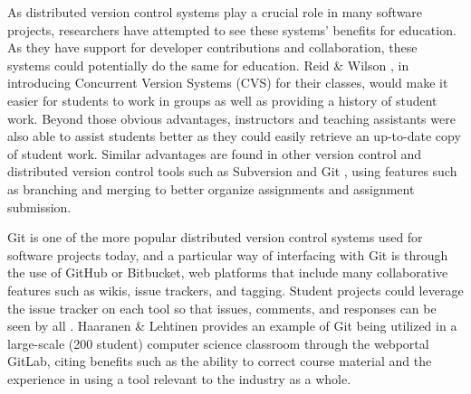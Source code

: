 As distributed version control systems play a crucial role in many software projects, researchers have attempted to see these systems’ benefits for education. As they have support for developer contributions and collaboration, these systems could potentially do the same for education. Reid \& Wilson \cite{reid2005learning}, in introducing Concurrent Version Systems (CVS) for their classes, would make it easier for students to work in groups as well as providing a history of student work. Beyond those obvious advantages, instructors and teaching assistants were also able to assist students better as they could easily retrieve an up-to-date copy of student work. Similar advantages are found in other version control and distributed version control tools such as Subversion \cite{clifton2007subverting} and Git \cite{griffin2013github}, using features such as branching and merging to better organize assignments and assignment submission.

Git is one of the more popular distributed version control systems used for software projects today, and a particular way of interfacing with Git is through the use of GitHub or Bitbucket, web platforms that include many collaborative features such as wikis, issue trackers, and tagging. Student projects could leverage the issue tracker on each tool so that issues, comments, and responses can be seen by all \cite{kelleher2014employing}. Haaranen & Lehtinen \cite{haaranen2015teaching} provides an example of Git being utilized in a large-scale (200 student) computer science classroom through the webportal GitLab, citing benefits such as the ability to correct course material and the experience in using a tool relevant to the industry as a whole.




